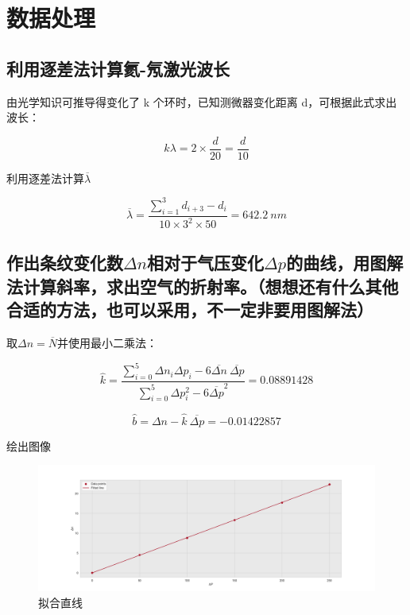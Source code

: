 \documentclass{ctexart}
\begin{document}

\newpage

\section{数据处理}
\subsection{利用逐差法计算氦-氖激光波长}

由光学知识可推导得变化了 k 个环时，已知测微器变化距离 d，可根据此式求出波长：

$$ k\lambda = 2 \times \frac{d}{20} = \frac{d}{10} $$

利用逐差法计算$\overline{\lambda}$

$$\overline{\lambda}=\frac{\sum\limits_{i=1}^{3} d_{i+3}-d_i }{10\times3^2\times50} = 642.2 \ nm$$
\subsection{作出条纹变化数$\Delta n$相对于气压变化$\Delta p$的曲线，用图解法计算斜率，求出空气的折射率。（想想还有什么其他合适的方法，也可以采用，不一定非要用图解法）}

取$ \Delta n = \overline{N} $并使用最小二乘法：

$$ \widehat{k} = \frac{\sum\limits_{i=0}^{5}\Delta n_i \Delta p_i - 6\overline{\Delta n} \ \overline{\Delta p}}{\sum\limits_{i=0}^{5}\Delta  p_i^2-6\overline{\Delta p}^2} = 0.08891428 $$

$$ \widehat{b} = \Delta n - \widehat{k} \ \overline{\Delta p} = -0.01422857 $$

绘出图像

\begin{figure}[h]
    \centering
    \includegraphics[width=\textwidth]{./pic/plot.png}
    \caption{拟合直线}
    \label{fig: data}
\end{figure}
\end{document}
